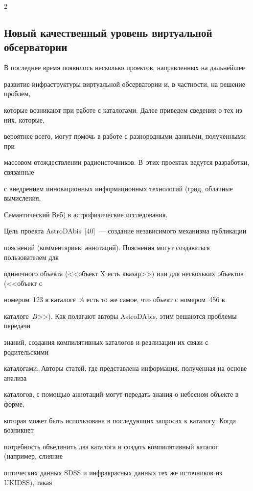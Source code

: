\begin{multicols}{2}
\begin{itemize}
  \end{itemize}

  

\subsection{Новый качественный уровень виртуальной обсерватории}



      В последнее время появилось несколько проектов, направленных на дальнейшее 

развитие инфраструктуры виртуальной обсерватории и, в част\-ности, на решение проблем, 

которые возникают при работе с каталогами. Далее приведем сведения о тех из них, которые, 

вероятнее всего, могут помочь в работе с разнородными данными, полученными при 

массовом отождествлении радиоисточников. В~этих проектах ведутся разработки, связанные 

с внедрением инновационных информационных технологий (грид, облачные вычисления, 

Семантический Веб) в астрофизические исследования.

      

      Цель проекта AstroDAbis~[40]~--- создание независимого механизма публикации 

пояснений (комментариев, аннотаций). Пояснения могут создаваться пользователем для 

одиночного объекта (<<объект X есть квазар>>) или для нескольких объектов (<<объект с 

номером~123 в каталоге~$A$ есть то же самое, что объект с номером~456 в 

каталоге~$B$>>). Как полагают авторы AstroDAbis, этим решаются проблемы передачи 

знаний, создания компилятивных каталогов и реализации их связи с родительскими 

каталогами. Авторы статей, где представлена информация, полученная на основе анализа 

каталогов, с помощью аннотаций могут передать знания о небесном объекте в форме, 

которая может быть использована в последующих запросах к каталогу. Когда возникнет 

потребность объединить два каталога и создать компилятивный каталог (например, слияние 

оптических данных SDSS и инфракрасных данных тех же источников из UKIDSS), такая 


\end{multicols}
